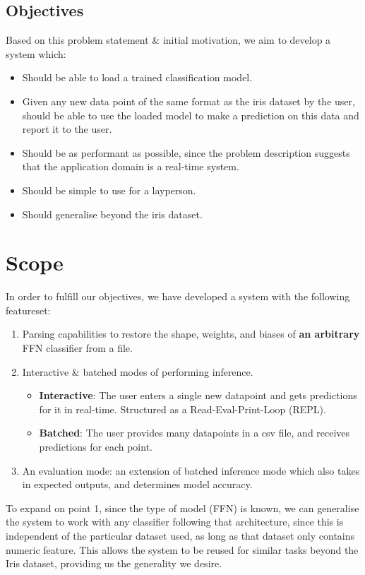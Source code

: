 \documentclass[12pt, titlepage]{article}
\begin{document}
\subsection{Objectives}
Based on this problem statement \& initial motivation, we aim to develop a system which:
\begin{itemize}
	\item Should be able to load a trained classification model.
	\item Given any new data point of the same format as the iris dataset by the user, should be able to use the loaded model to make a prediction on this data and report it to the user.
	\item Should be as performant as possible, since the problem description suggests that the application domain is a real-time system.
	\item Should be simple to use for a layperson.
	\item Should generalise beyond the iris dataset.
\end{itemize}

\section{Scope}
In order to fulfill our objectives, we have developed a system with the following featureset:
\begin{enumerate}
	\item Parsing capabilities to restore the shape, weights, and biases of \textbf{an arbitrary} FFN classifier from a file.
	\item Interactive \& batched modes of performing inference. \begin{itemize}
		\item \textbf{Interactive}: The user enters a single new datapoint and gets predictions for it in real-time. Structured as a Read-Eval-Print-Loop (REPL).
		\item \textbf{Batched}: The user provides many datapoints in a csv file, and receives predictions for each point.
	\end{itemize}
	\item An evaluation mode: an extension of batched inference mode which also takes in expected outputs, and determines model accuracy.
\end{enumerate}
To expand on point 1, since the type of model (FFN) is known, we can generalise the system to work with any classifier following that architecture, since this is independent of the particular dataset used, as long as that dataset only contains numeric feature. This allows the system to be reused for similar tasks beyond the Iris dataset, providing us the generality we desire.\bigskip
\end{document}
